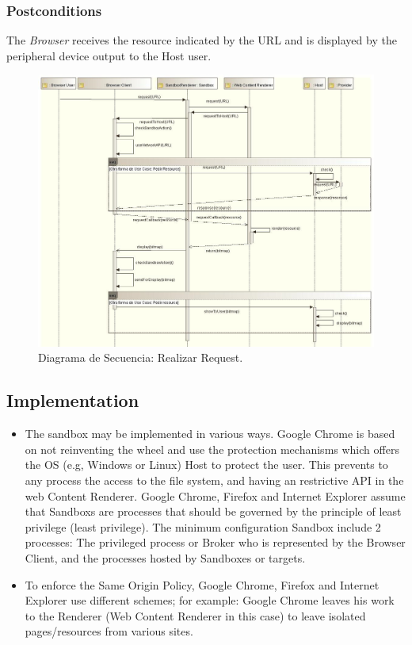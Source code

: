 \documentclass{sig-alternate-05-2015}
\begin{document}
    \subsubsection*{Postconditions} The \textit{Browser} receives the resource indicated by the URL and is displayed by the peripheral device output to the Host user.
      \begin{figure}[h!t]
          \centering
          \includegraphics[scale=0.61]{figures/requestResource_v2.jpg}
          \caption{Diagrama de Secuencia: Realizar Request.}
          \label{fig:SecReq}
      \end{figure}

  \subsection*{Implementation}
  \begin{itemize}
    \item The sandbox may be implemented in various ways. Google Chrome \cite{sandboxGC} is based on not reinventing the wheel and use the protection mechanisms which offers the OS (e.g, Windows or Linux) Host to protect the user. This prevents to any process the access to the file system, and having an restrictive API in the web Content Renderer. Google Chrome, Firefox and Internet Explorer assume that Sandboxs are processes that should be governed by the principle of least privilege (least privilege). The minimum configuration Sandbox include 2 processes: The privileged process or Broker who is represented by the Browser Client, and the processes hosted by Sandboxes or targets.
    \item To enforce the Same Origin Policy, Google Chrome, Firefox and Internet Explorer use different schemes; for example: Google Chrome leaves his work to the Renderer (Web Content Renderer in this case) to leave isolated pages/resources from various sites.
  \end{itemize}
\end{document}
